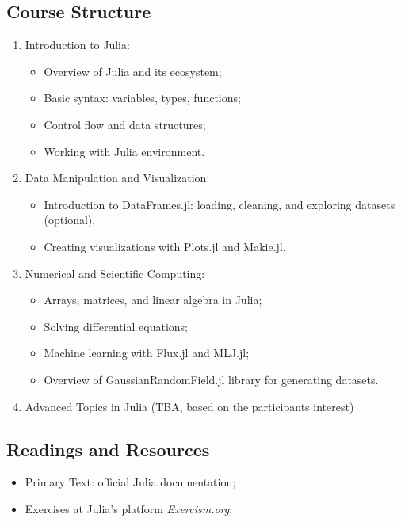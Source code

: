 \documentclass{article}
\begin{document}
\subsection*{Course Structure}
\begin{enumerate}
    \item Introduction to Julia:
          \begin{itemize}
              \item Overview of Julia and its ecosystem;
              \item Basic syntax: variables, types, functions;
              \item Control flow and data structures;
              \item Working with Julia environment.
          \end{itemize}

    \item Data Manipulation and Visualization:
          \begin{itemize}
              \item Introduction to DataFrames.jl: loading, cleaning, and exploring datasets (optional),
              \item Creating visualizations with Plots.jl and Makie.jl.
          \end{itemize}

    \item Numerical and Scientific Computing:
          \begin{itemize}
              \item Arrays, matrices, and linear algebra in Julia;
              \item Solving differential equations;
              \item Machine learning with Flux.jl and MLJ.jl;
              \item Overview of GaussianRandomField.jl library for generating datasets.
          \end{itemize}

    \item Advanced Topics in Julia (TBA, based on the participants interest)
\end{enumerate}

\subsection*{Readings and Resources}
\begin{itemize}
    \item Primary Text: official Julia documentation;
    \item Exercises at Julia's platform \textit{Exercism.org};
\end{itemize}
\end{document}
